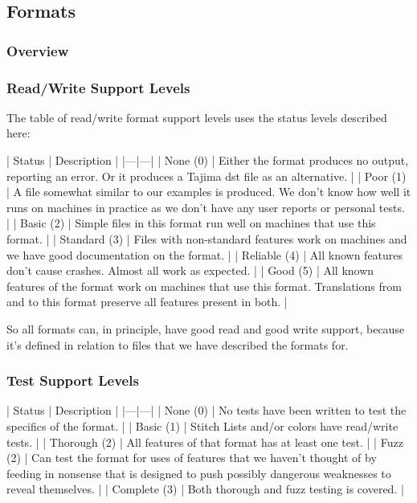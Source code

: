 \documentclass[a4paper, 11pt]{report}
\begin{document}
\subsection{Formats}

\subsubsection{Overview}

\subsubsection{Read/Write Support Levels}

The table of read/write format support levels uses the status levels described here:

| Status | Description |
|---|---|
| None (0) | Either the format produces no output, reporting an error. Or it produces a Tajima dst file as an alternative. |
| Poor (1) | A file somewhat similar to our examples is produced. We don't know how well it runs on machines in practice as we don't have any user reports or personal tests. |
| Basic (2) | Simple files in this format run well on machines that use this format. |
| Standard (3) | Files with non-standard features work on machines and we have good documentation on the format. |
| Reliable (4) | All known features don't cause crashes. Almost all work as expected. |
| Good (5) | All known features of the format work on machines that use this format. Translations from and to this format preserve all features present in both. |

So all formats can, in principle, have good read and good write support, because it's defined in relation to files that we have described the formats for.

\subsubsection{Test Support Levels}

| Status | Description |
|---|---|
| None (0) | No tests have been written to test the specifics of the format. |
| Basic (1) | Stitch Lists and/or colors have read/write tests. |
| Thorough (2) | All features of that format has at least one test. |
| Fuzz (2) | Can test the format for uses of features that we haven't thought of by feeding in nonsense that is designed to push possibly dangerous weaknesses to reveal themselves. |
| Complete (3) | Both thorough and fuzz testing is covered. |
\end{document}
